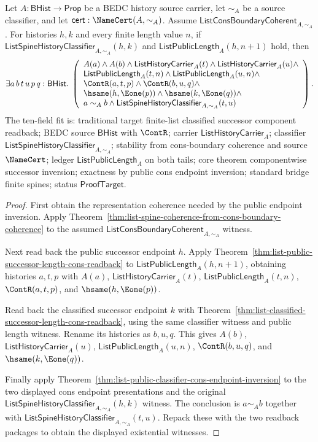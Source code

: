 \begin{theorem}
\label{thm:list-classified-successor-component-readback}
Let $A:\mathsf{BHist}\to\mathsf{Prop}$ be a BEDC history source carrier, let
$\sim_A$ be a source classifier, and let
$\mathsf{cert}:\NameCert(A,\sim_A)$. Assume
$\mathsf{ListConsBoundaryCoherent}_{A,\sim_A}$. For histories $h,k$ and every
finite length value $n$, if
$\mathsf{ListSpineHistoryClassifier}_{A,\sim_A}(h,k)$ and
$\mathsf{ListPublicLength}_A(h,n+1)$ hold, then
$$
\exists a\,b\,t\,u\,p\,q:\mathsf{BHist}.\;
\left(
\begin{array}{l}
A(a)\land A(b)\land
\mathsf{ListHistoryCarrier}_A(t)\land
\mathsf{ListHistoryCarrier}_A(u)\land\\
\mathsf{ListPublicLength}_A(t,n)\land
\mathsf{ListPublicLength}_A(u,n)\land\\
\ContR(a,t,p)\land \ContR(b,u,q)\land\\
\hsame(h,\Eone(p))\land \hsame(k,\Eone(q))\land\\
a\sim_A b\land
\mathsf{ListSpineHistoryClassifier}_{A,\sim_A}(t,u)
\end{array}
\right).
$$
The ten-field fit is: traditional target finite-list classified successor
component readback; BEDC source $\mathsf{BHist}$ with $\ContR$; carrier
$\mathsf{ListHistoryCarrier}_A$; classifier
$\mathsf{ListSpineHistoryClassifier}_{A,\sim_A}$; stability from
cons-boundary coherence and source $\NameCert$; ledger
$\mathsf{ListPublicLength}_A$ on both tails; core theorem componentwise
successor inversion; exactness by public cons endpoint inversion; standard
bridge finite spines; status $\mathsf{ProofTarget}$.
\end{theorem}
\begin{proof}
First obtain the representation coherence needed by the public endpoint
inversion. Apply
Theorem~\ref{thm:list-spine-coherence-from-cons-boundary-coherence} to the
assumed $\mathsf{ListConsBoundaryCoherent}_{A,\sim_A}$ witness.

Next read back the public successor endpoint $h$. Apply
Theorem~\ref{thm:list-public-successor-length-cons-readback} to
$\mathsf{ListPublicLength}_A(h,n+1)$, obtaining histories $a,t,p$ with
$A(a)$, $\mathsf{ListHistoryCarrier}_A(t)$,
$\mathsf{ListPublicLength}_A(t,n)$, $\ContR(a,t,p)$, and
$\hsame(h,\Eone(p))$.

Read back the classified successor endpoint $k$ with
Theorem~\ref{thm:list-classified-successor-length-cons-readback}, using the
same classifier witness and public length witness. Rename its histories as
$b,u,q$. This gives $A(b)$, $\mathsf{ListHistoryCarrier}_A(u)$,
$\mathsf{ListPublicLength}_A(u,n)$, $\ContR(b,u,q)$, and
$\hsame(k,\Eone(q))$.

Finally apply Theorem~\ref{thm:list-public-classifier-cons-endpoint-inversion}
to the two displayed cons endpoint presentations and the original
$\mathsf{ListSpineHistoryClassifier}_{A,\sim_A}(h,k)$ witness. The conclusion
is $a\sim_A b$ together with
$\mathsf{ListSpineHistoryClassifier}_{A,\sim_A}(t,u)$. Repack these with the
two readback packages to obtain the displayed existential witnesses.
\end{proof}

